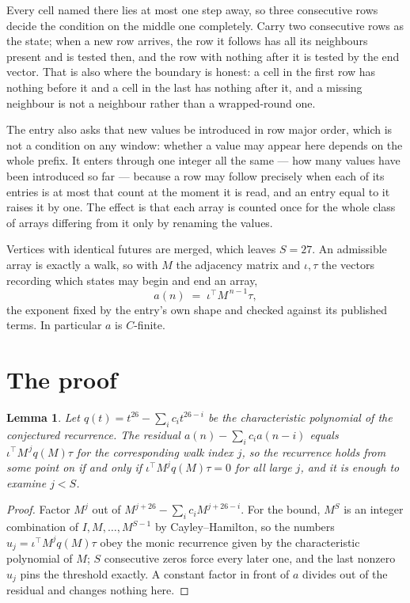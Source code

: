 \documentclass[11pt,a4paper]{article}
\theoremstyle{plain}
\newtheorem{lemma}[theorem]{Lemma}
\theoremstyle{definition}
\begin{document}
Every cell named there lies at most one step away, so three consecutive rows decide the condition on the middle one completely. Carry two consecutive rows as the state; when a new row arrives, the row it follows has all its neighbours present and is tested then, and the row with nothing after it is tested by the end vector. That is also where the boundary is honest: a cell in the first row has nothing before it and a cell in the last has nothing after it, and a missing neighbour is not a neighbour rather than a wrapped-round one.

The entry also asks that new values be introduced in row major order, which is not a condition on any window: whether a value may appear here depends on the whole prefix. It enters through one integer all the same --- how many values have been introduced so far --- because a row may follow precisely when each of its entries is at most that count at the moment it is read, and an entry equal to it raises it by one. The effect is that each array is counted once for the whole class of arrays differing from it only by renaming the values.

Vertices with identical futures are merged, which leaves $S=27$. An admissible array is exactly a walk, so with $M$ the adjacency matrix and $\iota,\tau$ the vectors recording which states may begin and end an array,
\[
a(n)\;=\;\iota^{\!\top}M^{\,n-1}\tau ,
\]
the exponent fixed by the entry's own shape and checked against its published terms. In
particular $a$ is $C$-finite.

\section{The proof}

\begin{lemma}\label{lem:crit}
Let $q(t)=t^{26}-\sum_i c_it^{26-i}$ be the characteristic polynomial of the
conjectured recurrence. The residual $a(n)-\sum_ic_ia(n-i)$ equals
$\iota^{\!\top}M^{\,j}q(M)\tau$ for the corresponding walk index $j$, so the recurrence
holds from some point on if and only if $\iota^{\!\top}M^{j}q(M)\tau=0$ for all large $j$,
and it is enough to examine $j<S$.
\end{lemma}

\begin{proof}
Factor $M^{j}$ out of $M^{j+26}-\sum_ic_iM^{j+26-i}$. For the bound, $M^{S}$
is an integer combination of $I,M,\dots,M^{S-1}$ by Cayley--Hamilton, so the numbers
$u_j=\iota^{\!\top}M^{j}q(M)\tau$ obey the monic recurrence given by the characteristic
polynomial of $M$; $S$ consecutive zeros force every later one, and the last nonzero $u_j$
pins the threshold exactly. A constant factor in front of $a$ divides out of the residual and
changes nothing here.
\end{proof}
\end{document}
